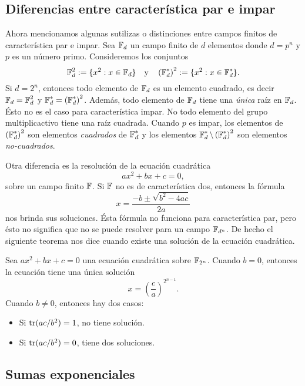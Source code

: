 \subsection{Diferencias entre característica par e impar}

Ahora mencionamos algunas sutilizas o distinciones entre
campos finitos de característica par e impar. Sea $\operatorname{\mathbb{F}}_d$ un
campo finito de $d$ elementos donde $d = p^{n}$ y $p$ es un
número primo. Consideremos los conjuntos 
\[
  \operatorname{\mathbb{F}}_d^2 := \{x^2 : x \in \operatorname{\mathbb{F}}_d\}
  \quad \text{y} \quad
  \left(\operatorname{\mathbb{F}}_d^*\right)^2 := \{x^2 : x \in \operatorname{\mathbb{F}}_d^{*}\}.
\] 
Si $d = 2^{n}$, entonces todo elemento de $\operatorname{\mathbb{F}}_d$ es un
elemento cuadrado, es decir $\operatorname{\mathbb{F}}_d = \operatorname{\mathbb{F}}_d^{2}$ y $\operatorname{\mathbb{F}}_d^{*} =
\left( \operatorname{\mathbb{F}}_d^{*} \right)^2$. Además, todo elemento de $\operatorname{\mathbb{F}}_d$
tiene una \textit{única} raíz en $\operatorname{\mathbb{F}}_d$. Ésto no es el caso
para característica impar. No todo elemento del grupo
multiplicactivo tiene una raíz cuadrada. Cuando $p$ es
impar, los elementos de $\left( \operatorname{\mathbb{F}}_d^{*} \right)^2$ son
elementos \textit{cuadrados} de $\operatorname{\mathbb{F}}_d^{*}$ y los elementos
$\operatorname{\mathbb{F}}_d^{*} \setminus \left( \operatorname{\mathbb{F}}_d^{*} \right)^2$ son elementos
\textit{no-cuadrados}.

Otra diferencia es la resolución de la ecuación cuadrática
\begin{equation}
  ax^2 + bx + c = 0,
\end{equation}
sobre un campo finito $\operatorname{\mathbb{F}}$. Si $\operatorname{\mathbb{F}}$ no es de característica
dos, entonces la fórmula
\begin{equation}
  x = \frac{-b \pm \sqrt{b^2 - 4ac}}{2a}
\end{equation}
nos brinda sus soluciones. Ésta fórmula no funciona para
característica par, pero ésto no significa que no se puede
resolver para un campo $\operatorname{\mathbb{F}}_{d^{n}}$. De hecho el siguiente
teorema nos dice cuando existe una solución de la ecuación
cuadrática.
\begin{theorem}
  Sea $ax^2 + bx + c = 0$ una ecuación cuadrática sobre
  $\operatorname{\mathbb{F}}_{2^{n}}$. Cuando $b = 0$, entonces la ecuación tiene
  una única solución
  \[
    x = \left( \frac{c}{a} \right)^{2^{n-1}}.
  \] 
  Cuando $b \neq 0$, entonces hay dos casos:
  \begin{itemize}
    \item Si $\operatorname{tr}(ac / b^2) = 1$, no tiene solución.
    \item Si $\operatorname{tr}(ac / b^2) = 0$, tiene dos soluciones.
  \end{itemize}
\end{theorem}

\subsection{Sumas exponenciales}

